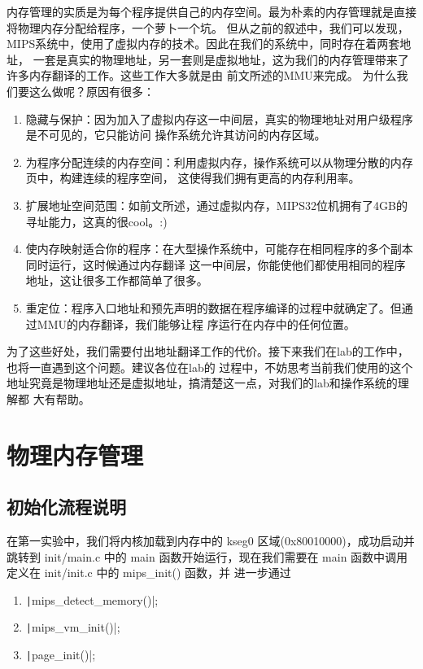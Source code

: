   内存管理的实质是为每个程序提供自己的内存空间。最为朴素的内存管理就是直接将物理内存分配给程序，一个萝卜一个坑。
  但从之前的叙述中，我们可以发现，MIPS系统中，使用了虚拟内存的技术。因此在我们的系统中，同时存在着两套地址，
  一套是真实的物理地址，另一套则是虚拟地址，这为我们的内存管理带来了许多内存翻译的工作。这些工作大多就是由
  前文所述的MMU来完成。
  为什么我们要这么做呢？原因有很多：
    \begin{enumerate}
      \item 隐藏与保护：因为加入了虚拟内存这一中间层，真实的物理地址对用户级程序是不可见的，它只能访问
      操作系统允许其访问的内存区域。
      \item 为程序分配连续的内存空间：利用虚拟内存，操作系统可以从物理分散的内存页中，构建连续的程序空间，
      这使得我们拥有更高的内存利用率。
      \item 扩展地址空间范围：如前文所述，通过虚拟内存，MIPS32位机拥有了4GB的寻址能力，这真的很cool。:)
      \item 使内存映射适合你的程序：在大型操作系统中，可能存在相同程序的多个副本同时运行，这时候通过内存翻译
      这一中间层，你能使他们都使用相同的程序地址，这让很多工作都简单了很多。
      \item 重定位：程序入口地址和预先声明的数据在程序编译的过程中就确定了。但通过MMU的内存翻译，我们能够让程
      序运行在内存中的任何位置。
    \end{enumerate}
  为了这些好处，我们需要付出地址翻译工作的代价。接下来我们在lab的工作中，也将一直遇到这个问题。建议各位在lab的
  过程中，不妨思考当前我们使用的这个地址究竟是物理地址还是虚拟地址，搞清楚这一点，对我们的lab和操作系统的理解都
  大有帮助。

\section{物理内存管理}

\subsection{初始化流程说明}
  在第一实验中，我们将内核加载到内存中的 kseg0 区域(0x80010000)，成功启动并跳转到 init/main.c 中的
   main 函数开始运行，现在我们需要在 main 函数中调用定义在 init/init.c 中的 mips\_init() 函数，并
  进一步通过

  \begin{enumerate}
    \item \texttt|mips_detect_memory()|;
    \item \texttt|mips_vm_init()|;
    \item \texttt|page_init()|;
  \end{enumerate}

